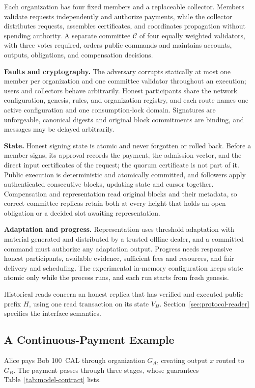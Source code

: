 Each organization has four fixed members and a replaceable collector. Members validate requests independently and authorize payments, while the collector distributes requests, assembles certificates, and coordinates propagation without spending authority. A separate committee $\mathcal C$ of four equally weighted validators, with three votes required, orders public commands and maintains accounts, outputs, obligations, and compensation decisions.

\noindent\textbf{Faults and cryptography.}
The adversary corrupts statically at most one member per organization and one committee validator throughout an execution; users and collectors behave arbitrarily. Honest participants share the network configuration, genesis, rules, and organization registry, and each route names one active configuration and one consumption-lock domain. Signatures are unforgeable, canonical digests and original block commitments are binding, and messages may be delayed arbitrarily.

\noindent\textbf{State.}
Honest signing state is atomic and never forgotten or rolled back. Before a member signs, its approval records the payment, the admission vector, and the direct input certificates of the request; the quorum certificate is not part of it. Public execution is deterministic and atomically committed, and followers apply authenticated consecutive blocks, updating state and cursor together. Compensation and representation read original blocks and their metadata, so correct committee replicas retain both at every height that holds an open obligation or a decided slot awaiting representation.

\noindent\textbf{Adaptation and progress.}
Representation uses threshold adaptation with material generated and distributed by a trusted offline dealer, and a committed command must authorize any adaptation output. Progress needs responsive honest participants, available evidence, sufficient fees and resources, and fair delivery and scheduling. The experimental in-memory configuration keeps state atomic only while the process runs, and each run starts from fresh genesis.

Historical reads concern an honest replica that has verified and executed public prefix $H$, using one read transaction on its state $V_H$. Section~\ref{sec:protocol-reader} specifies the interface semantics.

\subsection{A Continuous-Payment Example}
\label{sec:model-example}
Alice pays Bob 100~CAL through organization $G_A$, creating output $x$
routed to $G_B$. The payment passes through three stages, whose guarantees
Table~\ref{tab:model-contract} lists.

